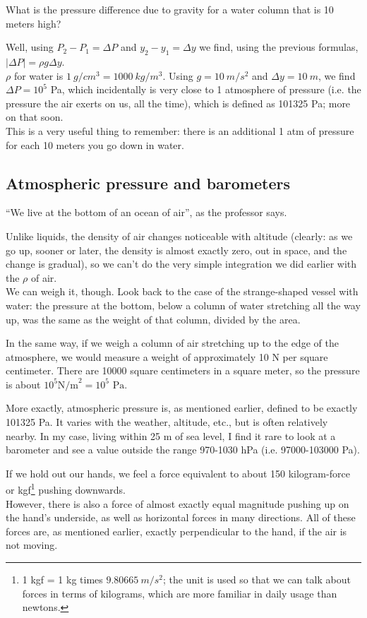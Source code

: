 What is the pressure difference due to gravity for a water column that is 10 meters high?

Well, using $P_2 - P_1 = \Delta P$ and $y_2 - y_1 = \Delta y$ we find, using the previous formulas, $|\Delta P| = \rho g \Delta y$.\\
$\rho$ for water is $\SI{1}{g/cm^3} = \SI{1000}{kg/m^3}$. Using $g = \SI{10}{m/s^2}$ and $\Delta y = \SI{10}{m}$, we find $\Delta P = 10^5$ Pa, which incidentally is very close to 1 atmosphere of pressure (i.e. the pressure the air exerts on us, all the time), which is defined as 101325 Pa; more on that soon.\\
This is a very useful thing to remember: there is an additional 1 atm of pressure for each 10 meters you go down in water.

\subsection{Atmospheric pressure and barometers}

``We live at the bottom of an ocean of air'', as the professor says.

Unlike liquids, the density of air changes noticeable with altitude (clearly: as we go up, sooner or later, the density is almost exactly zero, out in space, and the change is gradual), so we can't do the very simple integration we did earlier with the $\rho$ of air.\\
We can weigh it, though. Look back to the case of the strange-shaped vessel with water: the pressure at the bottom, below a column of water stretching all the way up, was the same as the weight of that column, divided by the area.

In the same way, if we weigh a column of air stretching up to the edge of the atmosphere, we would measure a weight of approximately 10 N per square centimeter. There are 10000 square centimeters in a square meter, so the pressure is about $10^5 \text{N/m}^2 = 10^5 \text{ Pa}$.

More exactly, atmospheric pressure is, as mentioned earlier, defined to be exactly 101325 Pa. It varies with the weather, altitude, etc., but is often relatively nearby. In my case, living within 25 m of sea level, I find it rare to look at a barometer and see a value outside the range 970-1030 hPa (i.e. 97000-103000 Pa).

If we hold out our hands, we feel a force equivalent to about 150 kilogram-force or kgf\footnote{1 kgf = 1 kg times $\SI{9.80665}{m/s^2}$; the unit is used so that we can talk about forces in terms of kilograms, which are more familiar in daily usage than newtons.} pushing downwards.\\
However, there is also a force of almost exactly equal magnitude pushing up on the hand's underside, as well as horizontal forces in many directions. All of these forces are, as mentioned earlier, exactly perpendicular to the hand, if the air is not moving.

